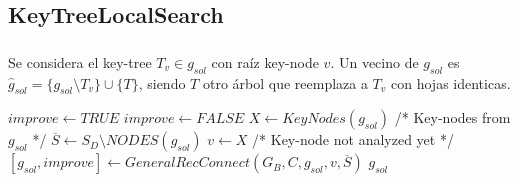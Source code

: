 \subsection{KeyTreeLocalSearch}
\begin{frame}\frametitle{}
\begin{definition}
\begin{small}
Se considera el key-tree $T_v \in g_{sol}$ con raíz key-node $v$.  
Un vecino de $g_{sol}$ es $\hat{g}_{sol} = \{ g_{sol}\setminus T_v \} \cup \{T\}$, siendo 
$T$ otro árbol que reemplaza a $T_v$ con hojas identicas. 
\end{small}
\end{definition}
\begin{block}{}
\begin{algorithm}[H]
\caption{$g_{sol} = KeyTreeLocalSearch(G_B,C,g_{sol})$}
\begin{algorithmic}[1]
\begin{scriptsize}
\STATE $improve \leftarrow TRUE$
\STATE $improve \leftarrow FALSE$
\STATE $ X \leftarrow KeyNodes(g_{sol})$ /* Key-nodes from $g_{sol}$ */
\STATE $\overline{S} \leftarrow S_D \setminus NODES(g_{sol})$
\STATE $v \leftarrow X$ /* Key-node not analyzed yet */
\STATE $[g_{sol},improve] \leftarrow GeneralRecConnect(G_B,C,g_{sol},v,\overline{S})$
\ENDWHILE
\ENDWHILE
\RETURN $g_{sol}$
\end{scriptsize}
\end{algorithmic}
\end{algorithm}
\end{block}
\end{frame}

